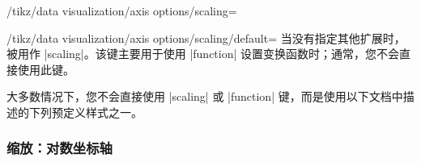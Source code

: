 \begin{key}{/tikz/data visualization/axis options/scaling=}
\begin{key}{/tikz/data visualization/axis options/scaling/default=}
        当没有指定其他扩展时， 被用作 |scaling|。该键主要用于使用 |function| 设置变换函数时；通常，您不会直接使用此键。
    \end{key}
\end{key}


大多数情况下，您不会直接使用 |scaling| 或 |function| 键，而是使用以下文档中描述的下列预定义样式之一。


\subsubsection{缩放：对数坐标轴}

